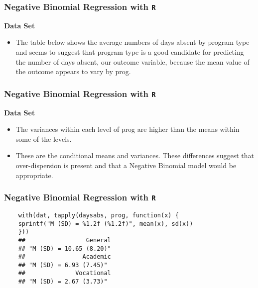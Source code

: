 \documentclass[00-GLMregslides.tex]{subfiles}
\begin{document}
\begin{frame}[fragile]
	\frametitle{Negative Binomial Regression with \texttt{R} }
	\Large
\textbf{Data Set}
\begin{itemize}
\item The table below shows the average numbers of days absent by program type and seems to 
	suggest that program type is a good candidate for predicting the number of days absent, our outcome variable, 
	because the mean value of the outcome appears to vary by prog. 
	
\end{itemize}
\end{frame}
\begin{frame}[fragile]
	\frametitle{Negative Binomial Regression with \texttt{R} }
	\Large
\textbf{Data Set}
\begin{itemize}	
\item The variances within each level of prog are higher than the means within some of the levels. 
\item These are the conditional means and variances. These differences suggest that over-dispersion is present and 
that a Negative Binomial model would be appropriate.
\end{itemize}
\end{frame}
\begin{frame}[fragile]
	\frametitle{Negative Binomial Regression with \texttt{R} }
	\large
		\begin{verbatim}
	with(dat, tapply(daysabs, prog, function(x) {
	sprintf("M (SD) = %1.2f (%1.2f)", mean(x), sd(x))
	}))
	##                 General                           
	## "M (SD) = 10.65 (8.20)"  
	##                Academic  
	## "M (SD) = 6.93 (7.45)" 
	##              Vocational 
	## "M (SD) = 2.67 (3.73)"
	\end{verbatim}
	\end{frame}
\end{document}
